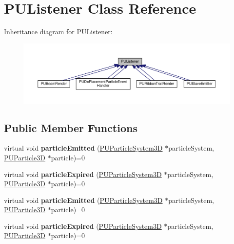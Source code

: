 \hypertarget{classPUListener}{}\section{P\+U\+Listener Class Reference}
\label{classPUListener}


Inheritance diagram for P\+U\+Listener\+:
\nopagebreak
\begin{figure}[H]
\begin{center}
\leavevmode
\includegraphics[width=350pt]{classPUListener__inherit__graph}
\end{center}
\end{figure}
\subsection*{Public Member Functions}
\begin{DoxyCompactItemize}
\item 
\mbox{\label{classPUListener_a5f92c572429f3a9a68c0c6aa2391c2b8}} 
virtual void {\bfseries particle\+Emitted} (\hyperlink{classPUParticleSystem3D}{P\+U\+Particle\+System3D} $\ast$particle\+System, \hyperlink{structPUParticle3D}{P\+U\+Particle3D} $\ast$particle)=0
\item 
\mbox{\label{classPUListener_a123428504ef41b35c5512449958768c2}} 
virtual void {\bfseries particle\+Expired} (\hyperlink{classPUParticleSystem3D}{P\+U\+Particle\+System3D} $\ast$particle\+System, \hyperlink{structPUParticle3D}{P\+U\+Particle3D} $\ast$particle)=0
\item 
\mbox{\label{classPUListener_a5f92c572429f3a9a68c0c6aa2391c2b8}} 
virtual void {\bfseries particle\+Emitted} (\hyperlink{classPUParticleSystem3D}{P\+U\+Particle\+System3D} $\ast$particle\+System, \hyperlink{structPUParticle3D}{P\+U\+Particle3D} $\ast$particle)=0
\item 
\mbox{\label{classPUListener_a123428504ef41b35c5512449958768c2}} 
virtual void {\bfseries particle\+Expired} (\hyperlink{classPUParticleSystem3D}{P\+U\+Particle\+System3D} $\ast$particle\+System, \hyperlink{structPUParticle3D}{P\+U\+Particle3D} $\ast$particle)=0
\end{DoxyCompactItemize}


